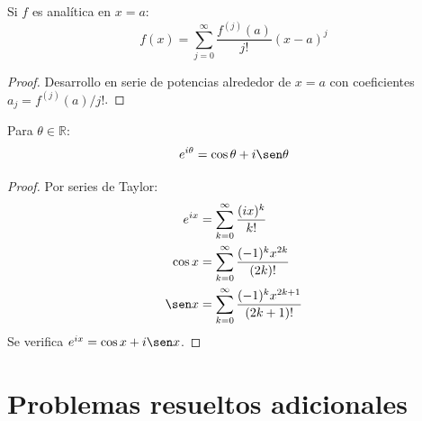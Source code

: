 \begin{lemma}
Si $f$ es analítica en $x=a$:
\[
f(x) = \sum_{j=0}^\infty \frac{f^{(j)}(a)}{j!} (x - a)^j
\]
\begin{proof}
Desarrollo en serie de potencias alrededor de $x=a$ con coeficientes $a_j = f^{(j)}(a)/j!$.
\end{proof}
\end{lemma}

\begin{theorem}\label{demformeuler}
Para $\theta \in \mathbb{R}$:
\[
e^{i\theta} = \cos \theta + i \sen \theta
\]
\begin{proof}
Por series de Taylor:
\begin{align*}
e^{ix} &= \sum_{k=0}^\infty \frac{(ix)^k}{k!} \\
\cos x &= \sum_{k=0}^\infty \frac{(-1)^k x^{2k}}{(2k)!} \\
\sen x &= \sum_{k=0}^\infty \frac{(-1)^k x^{2k+1}}{(2k+1)!}
\end{align*}
Se verifica $e^{ix} = \cos x + i \sen x$.
\end{proof}
\end{theorem}


\section{Problemas resueltos adicionales}

